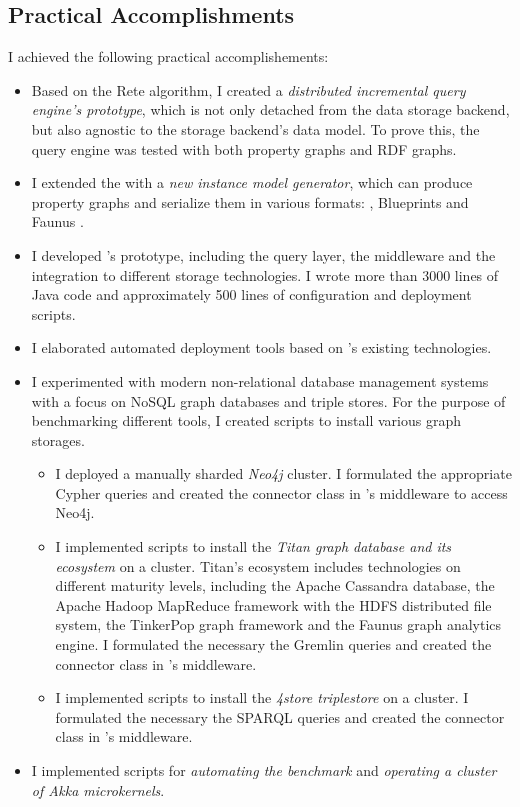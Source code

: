 \subsection{Practical Accomplishments}

I achieved the following practical accomplishements:

\begin{itemize}
  \item Based on the Rete algorithm, I created a \emph{distributed incremental query engine's prototype}, which is not only detached from the data storage backend, but also agnostic to the storage backend's data model. To prove this, the query engine was tested with both property graphs and RDF graphs.
  \item I extended the \tb{} with a \emph{new instance model generator}, which can produce property graphs and serialize them in various formats: \graphml{}, Blueprints \graphson{} and Faunus \graphson{}. %
  \item I developed \iqd{}'s prototype, including the query layer, the middleware and the integration to different storage technologies. I wrote more than 3000 lines of Java code and approximately 500 lines of configuration and deployment scripts.
  \item I elaborated automated deployment tools based on \eiq{}'s existing technologies.
  \item I experimented with modern non-relational database management systems with a focus on NoSQL graph databases and triple stores. For the purpose of benchmarking different tools, I created scripts to install various graph storages. 
  \begin{itemize}
    \item I deployed a manually sharded \emph{Neo4j} cluster. I formulated the appropriate Cypher queries and created the connector class in \iqd{}'s middleware to access Neo4j.
    \item I implemented scripts to install the \emph{Titan graph database and its ecosystem} on a cluster. Titan's ecosystem includes technologies on different maturity levels, including the Apache Cassandra database, the Apache Hadoop MapReduce framework with the HDFS distributed file system, the TinkerPop graph framework and the Faunus graph analytics engine. I formulated the necessary the Gremlin queries and created the connector class in \iqd{}'s middleware.
    \item I implemented scripts to install the \emph{4store triplestore} on a cluster. I formulated the necessary the SPARQL queries and created the connector class in \iqd{}'s middleware. 
  \end{itemize}
  \item I implemented scripts for \emph{automating the benchmark} and \emph{operating a cluster of Akka microkernels}.
\end{itemize}


